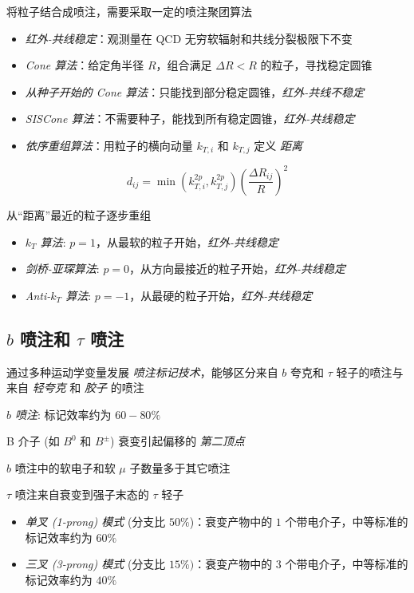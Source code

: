 将粒子结合成喷注，需要采取一定的喷注聚团算法

\begin{itemize}
    \item \emph{红外-共线稳定}：观测量在 QCD 无穷软辐射和共线分裂极限下不变
    \item \emph{Cone 算法}：给定角半径 $R$，组合满足 $\Delta R < R$ 的粒子，寻找稳定圆锥
    \item \emph{从种子开始的 Cone 算法}：只能找到部分稳定圆锥，\emph{红外-共线不稳定}
    \item \emph{SISCone 算法}：不需要种子，能找到所有稳定圆锥，\emph{红外-共线稳定}
    \item \emph{依序重组算法}：用粒子的横向动量 $k_{T,i}$ 和 $k_{T,j}$ 定义 \emph{距离}
\end{itemize}

\begin{equation}
    d_{ij} = \min \left(k_{T,i}^{2p}, k_{T,j}^{2p}\right) \left(\frac{\Delta R_{ij}}{R}\right)^2
\end{equation}

从“距离”最近的粒子逐步重组

\begin{itemize}
    \item \emph{$k_T$ 算法}: $p=1$，从最软的粒子开始，\emph{红外-共线稳定}
    \item \emph{剑桥-亚琛算法}: $p=0$，从方向最接近的粒子开始，\emph{红外-共线稳定}
    \item \emph{Anti-$k_T$ 算法}: $p=-1$，从最硬的粒子开始，\emph{红外-共线稳定}
\end{itemize}

\subsection{\texorpdfstring{$b$}{b} 喷注和 \texorpdfstring{$\tau$}{tau} 喷注}

通过多种运动学变量发展 \emph{喷注标记技术}，能够区分来自 $b$ 夸克和 $\tau$ 轻子的喷注与来自 \emph{轻夸克} 和 \emph{胶子} 的喷注

\emph{$b$ 喷注}: 标记效率约为 $60-80\%$

B 介子 (如 $B^0$ 和 $B^\pm$) 衰变引起偏移的 \emph{第二顶点}

$b$ 喷注中的软电子和软 $\mu$ 子数量多于其它喷注

$\tau$ 喷注来自衰变到强子末态的 $\tau$ 轻子

\begin{itemize}
    \item \emph{单叉 (1-prong) 模式} (分支比 $50\%$)：衰变产物中的 $1$ 个带电介子，中等标准的标记效率约为 $60\%$
    \item \emph{三叉 (3-prong) 模式} (分支比 $15\%)$：衰变产物中的 $3$ 个带电介子，中等标准的标记效率约为 $40\%$
\end{itemize}

